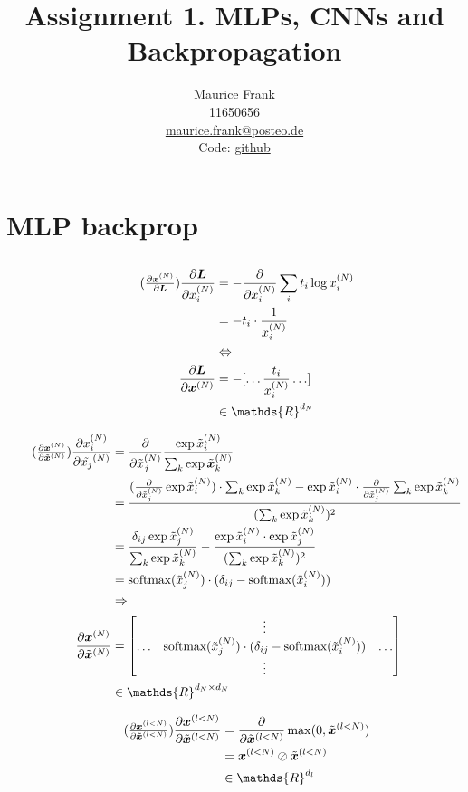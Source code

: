 \documentclass{article}
\title{Assignment 1. MLPs, CNNs and Backpropagation}
\author{%
  Maurice Frank\\
  11650656\\
  \href{mailto:maurice.frank@posteo.de}{maurice.frank@posteo.de} \\
  Code: \href{https://github.com/morris-frank/uvadlc_practicals_2019/tree/master/assignment_1/code}{github}
}
\newcommand\bM[1]{\ensuremath{\begin{bmatrix}#1\end{bmatrix}}}
\newcommand\·{\ensuremath{\cdot}}
\newcommand\…{\ensuremath{\ldots}}
\renewcommand\t{\ensuremath{\times}}
\newcommand{\LRA}{\ensuremath{\Leftrightarrow}}
\newcommand\f[2]{\ensuremath{\frac{#1}{#2}}}
\newcommand\pf[2]{\ensuremath{\frac{\partial {#1}}{\partial {#2}}}}
\newcommand*{\B}[1]{\ifmmode\bm{#1}\else\textbf{#1}\fi}
\newcommand\1{\ensuremath{\mathds{1}}}
\newcommand\R{\ensuremath{\mathds{R}}}
\begin{document}
\maketitle
\section{MLP backprop}
\subsection{}
\subsubsection{}
\begin{align*}
  \tag{$\pf{\B{x}^{(N)}}{\B{L}}$}
  \pf{\B{L}}{x_i^{(N)}}
  &= -\pf{}{x_i^{(N)}}\sum_i t_i \log x_i^{(N)}\\
  &= -t_i\·\f{1}{x_i^{(N)}}\\
  &\LRA\\
  \pf{\B{L}}{\B{x}^{(N)}}
  &= -[\hdots \f{t_i}{x_i^{(N)}}\hdots]\\
  &\in\R^{d_N}
\end{align*}

\begin{align*}
  \tag{$\pf{\B{x}^{(N)}}{\tilde{\B{x}}^{(N)}}$}
  \pf{x_i^{(N)}}{\tilde{x_j}^{(N)}}
  &= \pf{}{\tilde{x}_j^{(N)}}\f{\exp{\tilde{x}_i^{(N)}}}{\sum_k \exp{\tilde{\B{x}}_k^{(N)}}}\\
  &= \f{(\pf{}{\tilde{x}^{(N)}_j}\exp{\tilde{x}^{(N)}_i})\·\sum_k\exp{\tilde{x}^{(N)}_k} - \exp{\tilde{x}^{(N)}_i}\·\pf{}{\tilde{x}^{(N)}_j}\sum_k\exp{\tilde{x}^{(N)}_k}}{(\sum_k\exp{\tilde{x}^{(N)}_k})^2}\\
  &= \f{\delta_{ij}\exp{\tilde{x}^{(N)}_j}}{\sum_k\exp{\tilde{x}^{(N)}_k}} - \f{\exp{\tilde{x}^{(N)}_i}\·\exp{\tilde{x}^{(N)}_j}}{(\sum_k\exp{\tilde{x}^{(N)}_k})^2}\\
  &= \text{softmax}(\tilde{x}^{(N)}_j)\·(\delta_{ij} - \text{softmax}(\tilde{x}^{(N)}_i))\\
  &\Rightarrow\\
  \pf{\B{x}^{(N)}}{\tilde{\B{x}}^{(N)}} &= \bM{& \vdots &\\\hdots & \text{softmax}(\tilde{x}^{(N)}_j)\·(\delta_{ij} - \text{softmax}(\tilde{x}^{(N)}_i)) & \hdots\\ & \vdots &}\\
  &\in\R^{d_N\t d_N}
\end{align*}

\begin{align*}
  \tag{$\pf{\B{x}^{(l<N)}}{\tilde{\B{x}}^{(l<N)}}$}
  \pf{\B{x}^{(l<N)}}{\tilde{\B{x}}^{(l<N)}}
  &= \pf{}{\tilde{\B{x}}^{(l<N)}}\max(0,\tilde{\B{x}}^{(l<N)})\\
  &= \B{x}^{(l<N)}\oslash\tilde{\B{x}}^{(l<N)}\\
  &\in\R^{d_l}
\end{align*}
\end{document}
